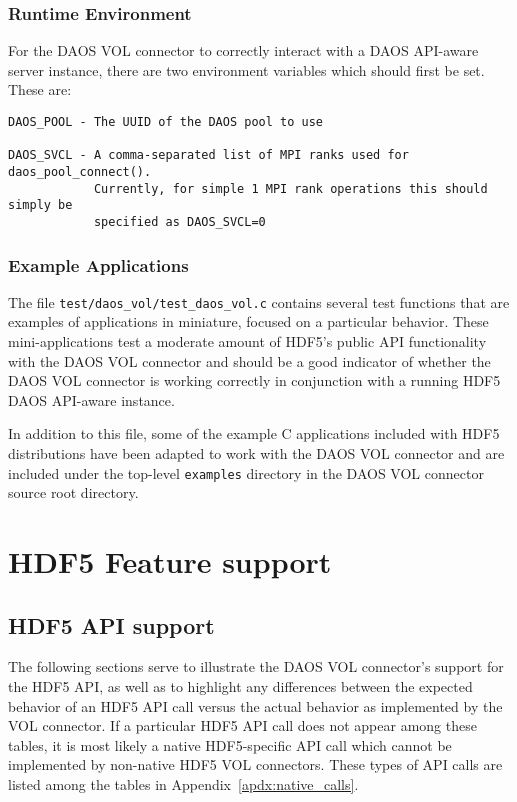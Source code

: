 \documentclass[12pt]{THG_Guide}
\begin{document}
\subsubsection{Runtime Environment}
\label{sec:runtime_env}

For the DAOS VOL connector to correctly interact with a DAOS API-aware server instance, there are two environment variables which should first be set. These are:

\begin{verbatim}
DAOS_POOL - The UUID of the DAOS pool to use

DAOS_SVCL - A comma-separated list of MPI ranks used for daos_pool_connect().
            Currently, for simple 1 MPI rank operations this should simply be
            specified as DAOS_SVCL=0
\end{verbatim}

\subsubsection{Example Applications}

The file \texttt{test/daos\_vol/test\_daos\_vol.c} contains several test functions that are examples of applications in miniature, focused on a particular behavior. These mini-applications test a moderate amount of HDF5's public API functionality with the DAOS VOL connector and should be a good indicator of whether the DAOS VOL connector is working correctly in conjunction with a running HDF5 DAOS API-aware instance.

In addition to this file, some of the example C applications included with HDF5 distributions have been adapted to work with the DAOS VOL connector and are included under the top-level \texttt{examples} directory in the DAOS VOL connector source root directory.

\newpage

\section{HDF5 Feature support}

\subsection{HDF5 API support}

The following sections serve to illustrate the DAOS VOL connector's support for the HDF5 API, as well as to highlight any differences between the expected behavior of an HDF5 API call versus the actual behavior as implemented by the VOL connector. If a particular HDF5 API call does not appear among these tables, it is most likely a native HDF5-specific API call which cannot be implemented by non-native HDF5 VOL connectors. These types of API calls are listed among the tables in Appendix~\ref{apdx:native_calls}.
\end{document}

